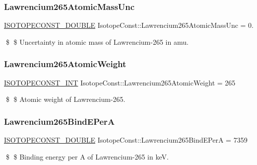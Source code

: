 \subsubsection{\texorpdfstring{Lawrencium265\+Atomic\+Mass\+Unc}{Lawrencium265AtomicMassUnc}}
{\footnotesize\ttfamily \mbox{\hyperlink{group___isotope_const-_macros_ga8f45a7272ce02c0b4c65c44636ed719a}{I\+S\+O\+T\+O\+P\+E\+C\+O\+N\+S\+T\+\_\+\+D\+O\+U\+B\+LE}} Isotope\+Const\+::\+Lawrencium265\+Atomic\+Mass\+Unc = 0.}

\$ \$ Uncertainty in atomic mass of Lawrencium-\/265 in amu. \mbox{\label{group___isotope_const-_lawrencium-_lr265_ga6c0929ca5699cdbe612f0abb1d03e07b}} 
\subsubsection{\texorpdfstring{Lawrencium265\+Atomic\+Weight}{Lawrencium265AtomicWeight}}
{\footnotesize\ttfamily \mbox{\hyperlink{group___isotope_const-_macros_ga5f18360b3e99483a35c32d789e62621c}{I\+S\+O\+T\+O\+P\+E\+C\+O\+N\+S\+T\+\_\+\+I\+NT}} Isotope\+Const\+::\+Lawrencium265\+Atomic\+Weight = 265}

\$ \$ Atomic weight of Lawrencium-\/265. \mbox{\label{group___isotope_const-_lawrencium-_lr265_ga3563b31372f14cb6a445a7c51c8e3512}} 
\subsubsection{\texorpdfstring{Lawrencium265\+Bind\+E\+PerA}{Lawrencium265BindEPerA}}
{\footnotesize\ttfamily \mbox{\hyperlink{group___isotope_const-_macros_ga8f45a7272ce02c0b4c65c44636ed719a}{I\+S\+O\+T\+O\+P\+E\+C\+O\+N\+S\+T\+\_\+\+D\+O\+U\+B\+LE}} Isotope\+Const\+::\+Lawrencium265\+Bind\+E\+PerA = 7359}

\$ \$ Binding energy per A of Lawrencium-\/265 in keV. \mbox{\label{group___isotope_const-_lawrencium-_lr265_ga8abb9e6e74febb3af1fc84a9d7077884}} 
